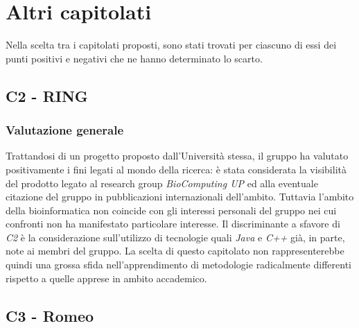 \clearpage
\section{Altri capitolati}
Nella scelta tra i capitolati proposti, sono stati trovati per ciascuno di essi dei punti positivi e negativi che ne hanno determinato lo scarto.

\subsection{C2 - RING}
        \subsubsection{Valutazione generale}
        Trattandosi di un progetto proposto dall'Università stessa, il gruppo ha valutato positivamente i fini legati al mondo della ricerca: è stata considerata la visibilità del prodotto legato al research group \emph{BioComputing UP} ed alla eventuale citazione del gruppo in pubblicazioni internazionali dell'ambito. Tuttavia l'ambito della bioinformatica non coincide con gli interessi personali del gruppo nei cui confronti non ha manifestato particolare interesse. Il discriminante a sfavore di \emph{C2} è la considerazione sull'utilizzo di tecnologie quali \emph{Java} e \emph{C++} già, in parte, note ai membri del gruppo. La scelta di questo capitolato non rappresenterebbe quindi una grossa sfida nell'apprendimento di metodologie radicalmente differenti rispetto a quelle apprese in ambito accademico.
        
\subsection{C3 - Romeo}
